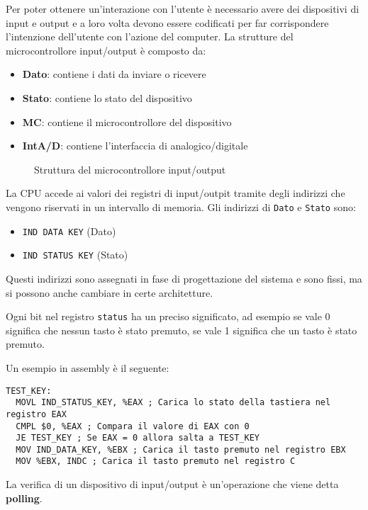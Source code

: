\documentclass[a4paper]{article}
\theoremstyle{break}
\theoremstyle{break}
\theoremstyle{break}
\theoremstyle{break}
\begin{document}
\noindent Per poter ottenere un'interazione con l'utente è necessario avere dei dispositivi
di input e output e a loro volta devono essere codificati per far corrispondere
l'intenzione dell'utente con l'azione del computer. La strutture del microcontrollore
input/output è composto da:
\begin{itemize}
	\item \textbf{Dato}: contiene i dati da inviare o ricevere
	\item \textbf{Stato}: contiene lo stato del dispositivo
	\item \textbf{MC}: contiene il microcontrollore del dispositivo
	\item \textbf{IntA/D}: contiene l'interfaccia di analogico/digitale
\end{itemize}
\begin{figure}[H]
	\centering
	\caption{Struttura del microcontrollore input/output}
\end{figure}

\noindent La CPU accede ai valori dei registri di input/outpit tramite degli indirizzi
che vengono riservati in un intervallo di memoria. Gli indirizzi di \texttt{Dato} e
\texttt{Stato} sono:
\begin{itemize}
	\item \texttt{IND DATA KEY} (Dato)
	\item \texttt{IND STATUS KEY} (Stato)
\end{itemize}
Questi indirizzi sono assegnati in fase di progettazione del sistema e sono fissi,
ma si possono anche cambiare in certe architetture.

\vspace{1em}
\noindent Ogni bit nel registro \texttt{status} ha un preciso significato, ad esempio
se vale 0 significa che nessun tasto è stato premuto, se vale 1 significa che un tasto
è stato premuto.

\vspace{1em}
\noindent Un esempio in assembly è il seguente:
\begin{lstlisting}[language={[x86masm]Assembler}]
 TEST_KEY:
  MOVL IND_STATUS_KEY, %EAX ; Carica lo stato della tastiera nel registro EAX
  CMPL $0, %EAX ; Compara il valore di EAX con 0
  JE TEST_KEY ; Se EAX = 0 allora salta a TEST_KEY
  MOV IND_DATA_KEY, %EBX ; Carica il tasto premuto nel registro EBX
  MOV %EBX, INDC ; Carica il tasto premuto nel registro C
\end{lstlisting}
\noindent La verifica di un dispositivo di input/output è un'operazione che viene detta
\textbf{polling}.
\end{document}
